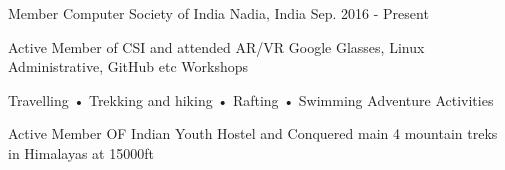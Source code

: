 \begin{cventries}
  \cventry
    {Member}
    {Computer Society of India}
    {Nadia, India}
    {Sep. 2016 - Present}
    {
      \begin{cvitems}
        \item {Active Member of CSI and attended AR/VR Google Glasses, Linux Administrative, GitHub etc Workshops }
       \end{cvitems}
    }
    \cventry
    {Travelling • Trekking and hiking • Rafting • Swimming}
    {Adventure Activities}
    {}
    {}
    {
      \begin{cvitems}
        \item {Active Member OF Indian Youth Hostel and Conquered main 4 mountain treks in Himalayas at 15000ft }
      \end{cvitems}
    }
\end{cventries}

